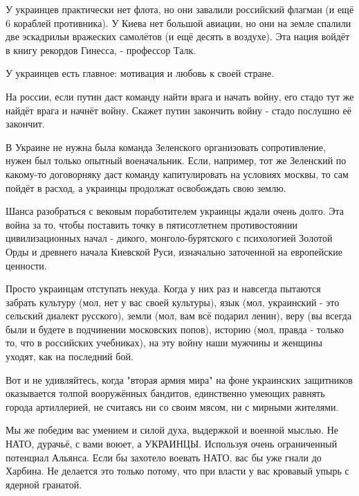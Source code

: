  
 
 
 
 

У украинцев практически нет флота, но они завалили российский флагман (и ещё 6
кораблей противника). У Киева нет большой авиации, но они на земле спалили две
эскадрильи вражеских самолётов (и ещё десять в воздухе). Эта нация войдёт в
книгу рекордов Гинесса, - профессор Талк.

У украинцев есть главное: мотивация и любовь к своей стране.

На россии, если путин даст команду найти врага и начать войну, его стадо тут же
найдёт врага и начнёт войну. Скажет путин закончить войну - стадо послушно её
закончит.

В Украине не нужна была команда Зеленского организовать сопротивление, нужен
был только опытный военачальник. Если, например, тот же Зеленский по какому-то
договорняку даст команду капитулировать на условиях москвы, то сам пойдёт в
расход, а украинцы продолжат освобождать свою землю.

Шанса разобраться с вековым поработителем украинцы ждали очень долго. Эта война
за то, чтобы поставить точку в пятисотлетнем противостоянии цивилизационных
начал - дикого, монголо-бурятского с психологией Золотой Орды и древнего начала
Киевской Руси, изначально заточенной на европейские ценности.

Просто украинцам отступать некуда. Когда у них раз и навсегда пытаются забрать
культуру (мол, нет у вас своей культуры), язык (мол, украинский - это сельский
диалект русского), земли (мол, вам всё подарил ленин), веру (вы всегда были и
будете в подчинении московских попов), историю (мол, правда - только то, что в
российских учебниках), на эту войну наши мужчины и женщины уходят, как на
последний бой.

Вот и не удивляйтесь, когда "вторая армия мира" на фоне украинских защитников
оказывается толпой вооружённых бандитов, единственно умеющих равнять города
артиллерией, не считаясь ни со своим мясом, ни с мирными жителями.

Мы же победим вас умением и силой духа, выдержкой и военной мыслью. Не НАТО,
дурачьё, с вами воюет, а УКРАИНЦЫ. Используя очень ограниченный потенциал
Альянса. Если бы захотело воевать НАТО, вас бы уже гнали до Харбина. Не
делается это только потому, что при власти у вас кровавый упырь с ядерной
гранатой.

